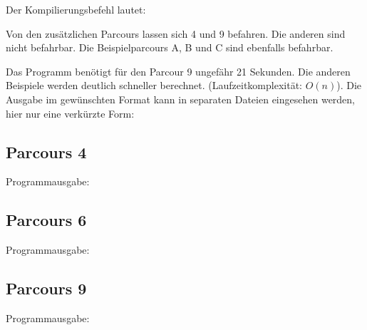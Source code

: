 Der Kompilierungsbefehl lautet:


Von den zusätzlichen Parcours lassen sich 4 und 9 befahren. Die anderen sind nicht befahrbar. Die Beispielparcours A, B und C sind ebenfalls befahrbar.

Das Programm benötigt für den Parcour 9 ungefähr 21 Sekunden. Die anderen Beispiele werden deutlich schneller berechnet. (Laufzeitkomplexität: \(O(n)\)).
Die Ausgabe im gewünschten Format kann in separaten Dateien eingesehen werden, hier nur eine verkürzte Form:
\subsection{Parcours 4}
	Programmausgabe:\\
\subsection{Parcours 6}
	Programmausgabe:\\
\subsection{Parcours 9}
	Programmausgabe:\\

